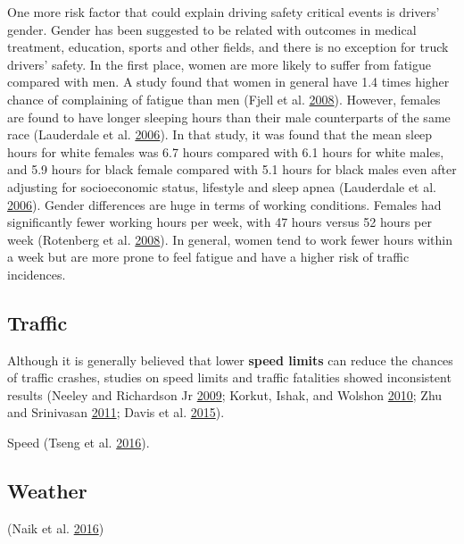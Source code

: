 \documentclass[12pt]{book}
\numberwithin{equation}{chapter}
\begin{document}
One more risk factor that could explain driving safety critical events is drivers' gender. Gender has been suggested to be related with outcomes in medical treatment, education, sports and other fields, and there is no exception for truck drivers' safety. In the first place, women are more likely to suffer from fatigue compared with men. A study found that women in general have 1.4 times higher chance of complaining of fatigue than men (Fjell et al. \protect\hyperlink{ref-fjell2008perceived}{2008}). However, females are found to have longer sleeping hours than their male counterparts of the same race (Lauderdale et al. \protect\hyperlink{ref-lauderdale2006objectively}{2006}). In that study, it was found that the mean sleep hours for white females was 6.7 hours compared with 6.1 hours for white males, and 5.9 hours for black female compared with 5.1 hours for black males even after adjusting for socioeconomic status, lifestyle and sleep apnea (Lauderdale et al. \protect\hyperlink{ref-lauderdale2006objectively}{2006}). Gender differences are huge in terms of working conditions. Females had significantly fewer working hours per week, with 47 hours versus 52 hours per week (Rotenberg et al. \protect\hyperlink{ref-rotenberg2008gender}{2008}). In general, women tend to work fewer hours within a week but are more prone to feel fatigue and have a higher risk of traffic incidences.

\hypertarget{traffic}{%
\subsection{Traffic}\label{traffic}}

Although it is generally believed that lower \textbf{speed limits} can reduce the chances of traffic crashes, studies on speed limits and traffic fatalities showed inconsistent results (Neeley and Richardson Jr \protect\hyperlink{ref-neeley2009effect}{2009}; Korkut, Ishak, and Wolshon \protect\hyperlink{ref-korkut2010freeway}{2010}; Zhu and Srinivasan \protect\hyperlink{ref-zhu2011comprehensive}{2011}; Davis et al. \protect\hyperlink{ref-davis2015longitudinal}{2015}).

Speed (Tseng et al. \protect\hyperlink{ref-tseng2016comprehensive}{2016}).

\hypertarget{weather}{%
\subsection{Weather}\label{weather}}

(Naik et al. \protect\hyperlink{ref-naik2016weather}{2016})
\end{document}
